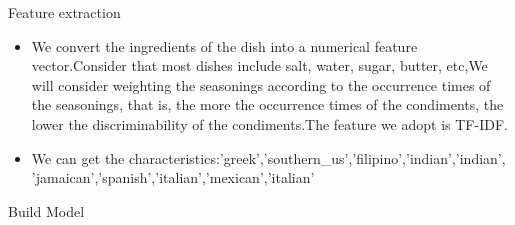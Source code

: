 \documentclass[
 size=14pt,
 paper=smartboard,  %
 mode=present, 		%
 display=slides, 	%
 style=tuliplab,  	%
 pauseslide,
 fleqn,leqno]{powerdot}
\begin{document}
\begin{slide}{Feature extraction}
  \begin{center}
  
  {
  \begin{itemize}
  \item 
  We convert the ingredients of the dish into a numerical feature vector.Consider that most dishes include salt, water, sugar, butter, etc,We will consider weighting the seasonings according to the occurrence times of the seasonings, that is, the more the occurrence times of the condiments, the lower the discriminability of the condiments.The feature we adopt is TF-IDF.\\
  \item
  We can get the characteristics:\lbrack'greek','southern\_us','filipino','indian','indian',\\
  'jamaican','spanish','italian','mexican','italian'\rbrack
  \end{itemize}
  }
  
  \end{center}
  \bigskip
  \begin{center}
  
  \end{center}
  \bigskip
  
  
  
  \end{slide}

\begin{slide}{Build Model}
  \begin{center}
  
  
  
  \end{center}
  \bigskip
  \begin{center}
  
  \end{center}
  \bigskip
\end{slide}


\end{document}
